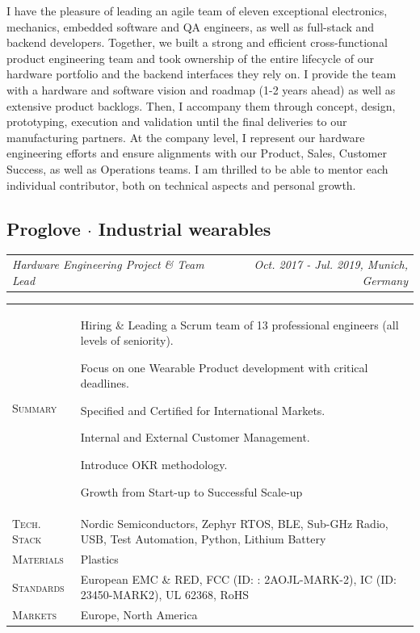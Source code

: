 \documentclass[10pt,a4paper]{moderncv}
\newcommand*{\makecareersubsection}[5]{
  \vspace{0.75em}
  \subsection{#1 {\color{color2}$\cdot$ #2}}
  \addvspace{-0.2em}
  {
    \color{color2}
    \begin{tabularx}{\textwidth}{LR}
      {\itshape #3} & {\itshape #4, #5}
    \end{tabularx}\par
  }
  \addvspace{1.25em}
  }
\begin{document}
  \begin{minipage}{\textwidth}
    \small
    I have the pleasure of leading an agile team of eleven exceptional electronics, mechanics, embedded software and QA engineers, as well as full-stack and backend developers. Together, we built a strong and efficient cross-functional product engineering team and took ownership of the entire lifecycle of our hardware portfolio and the backend interfaces they rely on. I provide the team with a hardware and software vision and roadmap (1-2 years ahead) as well as extensive product backlogs. Then, I accompany them through concept, design, prototyping, execution and validation until the final deliveries to our manufacturing partners. At the company level, I represent our hardware engineering efforts and ensure alignments with our Product, Sales, Customer Success, as well as Operations teams. I am thrilled to be able to mentor each individual contributor, both on technical aspects and personal growth.
  \end{minipage}
  

\makecareersubsection{Proglove}{Industrial wearables}
  {Hardware Engineering Project \& Team Lead}
  {Oct. 2017 - Jul. 2019}
  {Munich, Germany}

  \begin{tabularx}{\textwidth}{>{\scshape}l@{\hskip 3.5mm}L}
    Summary & Hiring \& Leading a Scrum team of 13 professional engineers (all levels of seniority).
    \par Focus on one Wearable Product development with critical deadlines.
    \par Specified and Certified for International Markets.
    \par Internal and External Customer Management. 
    \par Introduce OKR methodology.
    \par Growth from Start-up to Successful Scale-up\\
    Tech. Stack & Nordic Semiconductors, Zephyr RTOS, BLE, Sub-GHz Radio, USB, Test Automation, Python, Lithium Battery\\
    Materials & Plastics\\
    Standards & European EMC \& RED, FCC (ID: : 2AOJL-MARK-2), IC (ID: 23450-MARK2), UL 62368, RoHS\\
    Markets & Europe, North America\\
  \end{tabularx}

  \vspace{1.5em}
  
\end{document}
